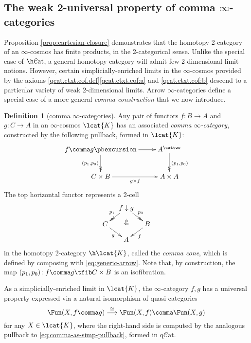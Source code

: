 \documentclass[12pt,reqno]{amsart}
\theoremstyle{plain}
\theoremstyle{definition}
\newtheorem{defn}[thm]{Definition}
\theoremstyle{remark}
\numberwithin{equation}{subsection}
\renewcommand{\Cat}{\mathcal{C}\mathrm{at}}
\renewcommand{\qCat}{\mathrm{q}\mathcal{C}\mathrm{at}}
\begin{document}
\subsection{The weak 2-universal property of comma \texorpdfstring{$\infty$}{infinity}-categories}

Proposition \ref{prop:cartesian-closure} demonstrates that the homotopy 2-category of an $\infty$-cosmos has finite products, in the 2-categorical sense. Unlike the special case of $\h\Cat$, a general homotopy category will admit few 2-dimensional limit notions. However, certain simplicially-enriched limits in the $\infty$-cosmos provided by the axioms  \ref{qcat.ctxt.cof.def}\ref{qcat.ctxt.cof:a} and \ref{qcat.ctxt.cof:b} descend to a particular variety of weak 2-dimensional limits.  Arrow $\infty$-categories define a special case of a more general \emph{comma construction} that we now introduce.


\begin{defn}[comma $\infty$-categories]\label{defn:comma} Any pair of functors  $f\colon B\to A$ and $g\colon C\to A$ in an $\infty$-cosmos $\lcat{K}$ has an associated \emph{comma $\infty$-category}, constructed by the following pullback, formed in $\lcat{K}$:
  \begin{equation}\label{eq:comma-as-simp-pullback}
    \xymatrix@=2.5em{
      {f\comma g}\pbexcursion \ar[r]\ar@{->>}[d]_{(p_1,p_0)} &
      {A^\cattwo} \ar@{->>}[d]^{(p_1,p_0)} \\
      {C\times B} \ar[r]_-{g\times f} & {A\times A}
    }
  \end{equation}
The top horizontal functor represents a 2-cell 
\[
    \xymatrix@=10pt{
      & f \downarrow g \ar@{->>}[dl]_{p_1} \ar@{->>}[dr]^{p_0} \ar@{}[dd]|(.4){\phi}|{\Leftarrow}  \\ 
      C \ar[dr]_g & & B \ar[dl]^f \\ 
      & A}
\]
in the homotopy 2-category $\h\lcat{K}$, called the \emph{comma cone}, which is defined by composing with \eqref{eq:generic-arrow}. Note that, by construction, the map $(p_1,p_0) \colon f \comma g \tfib C \times B$ is an isofibration.
\end{defn}

As a simplicially-enriched limit in $\lcat{K}$, the $\infty$-category $f \comma g$ has a universal property expressed via a natural isomorphism of quasi-categories
\[ \Fun(X, f\comma g)\stackrel{\cong}{\longrightarrow} \Fun(X,f) \comma \Fun(X,g)\] for any $X \in \lcat{K}$, where the right-hand side is computed by the analogous pullback to \eqref{eq:comma-as-simp-pullback}, formed in $\qCat$. 
\end{document}
